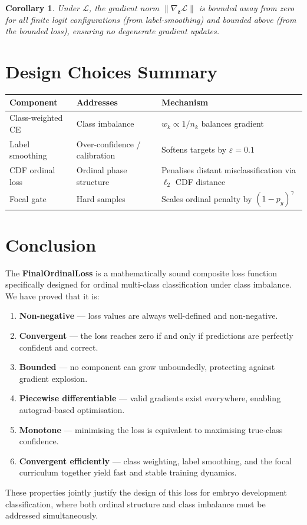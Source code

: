 \documentclass[12pt, a4paper]{article}
\newtheorem{corollary}{Corollary}[proposition]
\theoremstyle{definition}
\theoremstyle{remark}
\begin{document}
\begin{corollary}
Under $\mathcal{L}$, the gradient norm $\|\nabla_{\mathbf{z}}\mathcal{L}\|$
is bounded away from zero for all finite logit configurations (from
label-smoothing) and bounded above (from the bounded loss), ensuring
no degenerate gradient updates.
\end{corollary}

\section{Design Choices Summary}

\begin{center}
\renewcommand{\arraystretch}{1.45}
\begin{tabular}{@{}p{3.5cm} p{4.5cm} p{5.5cm}@{}}
\toprule
\textbf{Component} & \textbf{Addresses} & \textbf{Mechanism} \\
\midrule
\rowcolor{rowgray}
Class-weighted CE & Class imbalance & $w_k \propto 1/n_k$ balances gradient \\
Label smoothing & Over-confidence / calibration & Softens targets by $\varepsilon=0.1$ \\
\rowcolor{rowgray}
CDF ordinal loss & Ordinal phase structure & Penalises distant misclassification via $\ell_2$ CDF distance \\
Focal gate & Hard samples & Scales ordinal penalty by $(1-p_y)^\gamma$ \\
\bottomrule
\end{tabular}
\end{center}

\section{Conclusion}

The \textbf{FinalOrdinalLoss} is a mathematically sound composite loss
function specifically designed for ordinal multi-class classification
under class imbalance. We have proved that it is:
\begin{enumerate}[leftmargin=2em]
    \item \textbf{Non-negative} — loss values are always well-defined and non-negative.
    \item \textbf{Convergent} — the loss reaches zero if and only if
          predictions are perfectly confident and correct.
    \item \textbf{Bounded} — no component can grow unboundedly, protecting
          against gradient explosion.
    \item \textbf{Piecewise differentiable} — valid gradients exist
          everywhere, enabling autograd-based optimisation.
    \item \textbf{Monotone} — minimising the loss is equivalent to
          maximising true-class confidence.
    \item \textbf{Convergent efficiently} — class weighting, label
          smoothing, and the focal curriculum together yield fast
          and stable training dynamics.
\end{enumerate}

These properties jointly justify the design of this loss for embryo
development classification, where both ordinal structure and class
imbalance must be addressed simultaneously.
\end{document}
